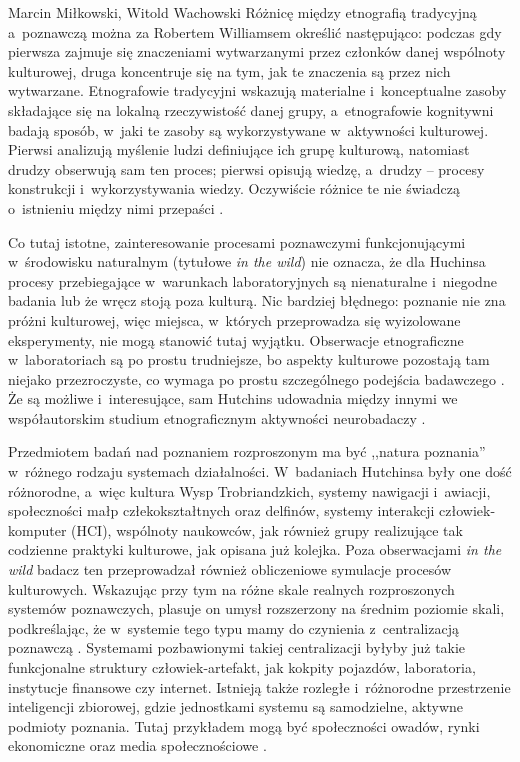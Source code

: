 \begin{artplenv2auth}{Marcin Miłkowski, Witold Wachowski}
Różnicę między etnografią tradycyjną a~poznawczą można za Robertem Williamsem określić następująco: podczas gdy pierwsza zajmuje się znaczeniami wytwarzanymi przez członków danej wspólnoty kulturowej, druga koncentruje się na tym, jak te znaczenia są przez nich wytwarzane. Etnografowie tradycyjni wskazują materialne i~konceptualne zasoby składające się na lokalną rzeczywistość danej grupy, a~etnografowie kognitywni badają sposób, w~jaki te zasoby są wykorzystywane w~aktywności kulturowej. Pierwsi analizują myślenie ludzi definiujące ich grupę kulturową, natomiast drudzy obserwują sam ten proces; pierwsi opisują wiedzę, a~drudzy -- procesy konstrukcji i~wykorzystywania wiedzy. Oczywiście różnice te nie świadczą o~istnieniu między nimi przepaści
\parencite[][s.~838]{williams_using_2006}.%


Co tutaj istotne, zainteresowanie procesami poznawczymi funkcjonującymi w~środowisku naturalnym (tytułowe \textit{in the wild}) nie oznacza, że dla Huchinsa procesy przebiegające w~warunkach laboratoryjnych są nienaturalne i~niegodne badania lub że wręcz stoją poza kulturą. Nic bardziej błędnego: poznanie nie zna próżni kulturowej, więc miejsca, w~których przeprowadza się wyizolowane eksperymenty, nie mogą stanowić tutaj wyjątku. Obserwacje etnograficzne w~laboratoriach są po prostu trudniejsze, bo aspekty kulturowe pozostają tam niejako przezroczyste, co wymaga po prostu szczególnego podejścia badawczego
\parencite[][s.~66–67]{hutchins_response_1996}. %
 Że są możliwe i~interesujące, sam Hutchins udowadnia między innymi we współautorskim studium etnograficznym aktywności neurobadaczy 
\parencite[][]{alac_i_2004}.%


Przedmiotem badań nad poznaniem rozproszonym ma być ,,natura poznania'' w~różnego rodzaju systemach działalności. W~badaniach Hutchinsa były one dość różnorodne, a~więc kultura Wysp Trobriandzkich, systemy nawigacji i~awiacji, społeczności małp człekokształtnych oraz delfinów, systemy interakcji człowiek-komputer (HCI), wspólnoty naukowców, jak również grupy realizujące tak codzienne praktyki kulturowe, jak opisana już kolejka. Poza obserwacjami \textit{in the wild} badacz ten przeprowadzał również obliczeniowe symulacje procesów kulturowych. Wskazując przy tym na różne skale realnych rozproszonych systemów poznawczych, plasuje on umysł rozszerzony na średnim poziomie skali, podkreślając, że w~systemie tego typu mamy do czynienia z~centralizacją poznawczą
\parencite[][s.~37]{hutchins_cultural_2014}. %
 Systemami pozbawionymi takiej centralizacji byłyby już takie funkcjonalne struktury człowiek-artefakt, jak kokpity pojazdów, laboratoria, instytucje finansowe czy internet. Istnieją także rozległe i~różnorodne przestrzenie inteligencji zbiorowej, gdzie jednostkami systemu są samodzielne, aktywne podmioty poznania. Tutaj przykładem mogą być społeczności owadów, rynki ekonomiczne oraz media społecznościowe 
\parencite[][s.~37]{hutchins_cultural_2014}.%



\end{artplenv2auth}
